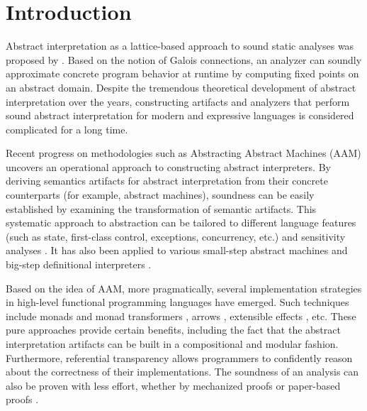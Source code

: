 \section{Introduction} \label{intro}

Abstract interpretation as a lattice-based approach to sound static analyses was
proposed by \citet{DBLP:conf/popl/CousotC77, CousotCousot79-1}. Based on the
notion of Galois connections, an analyzer can soundly approximate concrete
program behavior at runtime by computing fixed points on an abstract domain.
Despite the tremendous theoretical development of abstract interpretation over
the years, constructing artifacts and analyzers that perform sound abstract
interpretation for modern and expressive languages is considered complicated
for a long time.

Recent progress on methodologies such as Abstracting Abstract Machines (AAM)
\cite{DBLP:journals/jfp/HornM12, DBLP:conf/icfp/HornM10} uncovers an operational
approach to constructing abstract interpreters.  By deriving semantics artifacts
for abstract interpretation from their concrete counterparts (for example,
abstract machines), soundness can be easily established by examining the
transformation of semantic artifacts. This systematic approach to abstraction
can be tailored to different language features (such as state, first-class
control, exceptions, concurrency, etc.) and sensitivity analyses
\cite{DBLP:conf/icfp/Gilray0M16, DBLP:conf/popl/GilrayL0MH16,
Darais:2015:GTM:2814270.2814308}. It has also been applied to various small-step
abstract machines \cite{DBLP:journals/jfp/HornM12, DBLP:conf/icfp/HornM10,
Sergey:2013:MAI:2491956.2491979} and big-step definitional interpreters
\cite{Wei:2018:RAA:3243631.3236800, DBLP:journals/pacmpl/DaraisLNH17,
Keidel:2018:CSP:3243631.3236767}.


Based on the idea of AAM, more pragmatically, several implementation strategies
in high-level functional programming languages have emerged.  Such techniques
include monads and monad transformers \cite{DBLP:journals/pacmpl/DaraisLNH17,
Sergey:2013:MAI:2491956.2491979}, arrows \cite{Keidel:2018:CSP:3243631.3236767},
extensible effects \cite{Kiselyov:2015:FMM:2804302.2804319, Githubsemantic},
etc. These pure approaches provide certain benefits, including the fact that the
abstract interpretation artifacts can be built in a compositional and modular
fashion. Furthermore, referential transparency allows programmers to confidently
reason about the correctness of their implementations.  The soundness of an
analysis can also be proven with less effort, whether by mechanized proofs
\cite{Darais:2016:CGC:2951913.2951934} or paper-based proofs
\cite{Keidel:2018:CSP:3243631.3236767}.

